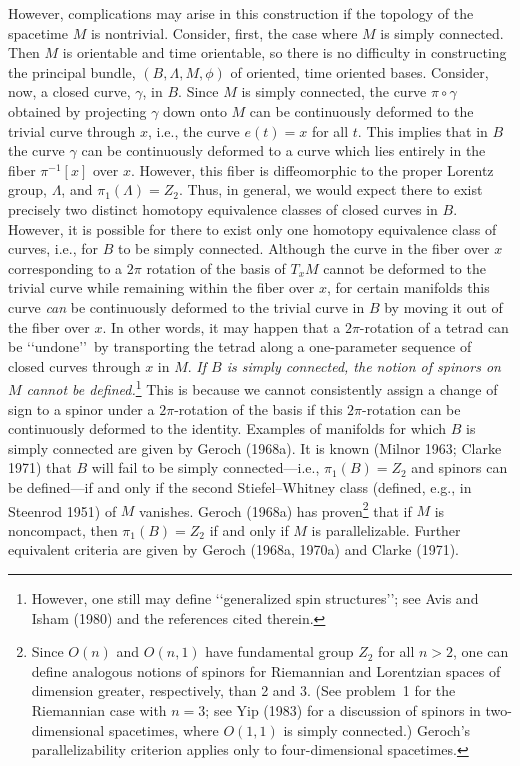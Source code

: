 However, complications may arise in this construction if the topology of the
spacetime \(M\) is nontrivial. Consider, first, the case where \(M\) is simply
connected. Then \(M\) is orientable and time orientable, so there is no difficulty
in constructing the principal bundle, \((B,\Lambda,M,\phi)\) of oriented, time
oriented bases. Consider, now, a closed curve, \(\gamma\), in \(B\). Since \(M\) is
simply connected, the curve \(\pi\circ\gamma\) obtained by projecting \(\gamma\)
down onto \(M\) can be continuously deformed to the trivial curve through \(x\),
i.e., the curve \(e(t)=x\) for all \(t\). This implies that in \(B\) the curve
\(\gamma\) can be continuously deformed to a curve which lies entirely in the fiber
\(\pi^{-1}[x]\) over \(x\). However, this fiber is diffeomorphic to the proper
Lorentz group, \(\Lambda\), and \(\pi_1(\Lambda)=Z_2\). Thus, in general, we would
expect there to exist precisely two distinct homotopy equivalence classes of closed
curves in \(B\). However, it is possible for there to exist only one homotopy
equivalence class of curves, i.e., for \(B\) to be simply connected. Although the
curve in the fiber over \(x\) corresponding to a \(2\pi\) rotation of the basis of
\(T_xM\) cannot be deformed to the trivial curve while remaining within the fiber over
\(x\), for certain manifolds this curve \emph{can} be continuously deformed to the
trivial curve in \(B\) by moving it out of the fiber over \(x\). In other words, it
may happen that a \(2\pi\)-rotation of a tetrad can be \lq\lq undone\rq\rq\ by
transporting the tetrad along a one-parameter sequence of closed curves through
\(x\) in \(M\). \emph{If \(B\) is simply connected, the notion of spinors on \(M\)
cannot be defined.}\footnote{However, one still may define \lq\lq generalized spin
structures\rq\rq; see Avis and Isham (1980) and the references cited therein.} This
is because we cannot consistently assign a change of sign to a spinor under a
\(2\pi\)-rotation of the basis if this \(2\pi\)-rotation can be continuously deformed
to the identity. Examples of manifolds for which \(B\) is simply connected are given
by Geroch (1968a). It is known (Milnor 1963; Clarke 1971) that \(B\) will fail to be
simply connected---i.e., \(\pi_1(B)=Z_2\) and spinors can be defined---if and only
if the second Stiefel--Whitney class (defined, e.g., in Steenrod 1951) of \(M\)
vanishes. Geroch (1968a) has proven\footnote{Since \(O(n)\) and \(O(n,1)\) have
fundamental group \(Z_2\) for all \(n>2\), one can define analogous notions of
spinors for Riemannian and Lorentzian spaces of dimension greater, respectively,
than 2 and 3. (See problem~1 for the Riemannian case with \(n=3\); see Yip (1983)
for a discussion of spinors in two-dimensional spacetimes, where \(O(1,1)\) is
simply connected.) Geroch's parallelizability criterion applies only to
four-dimensional spacetimes.} that if \(M\) is noncompact, then
\(\pi_1(B)=Z_2\) if and only if \(M\) is parallelizable. Further equivalent criteria
are given by Geroch (1968a, 1970a) and Clarke (1971).

